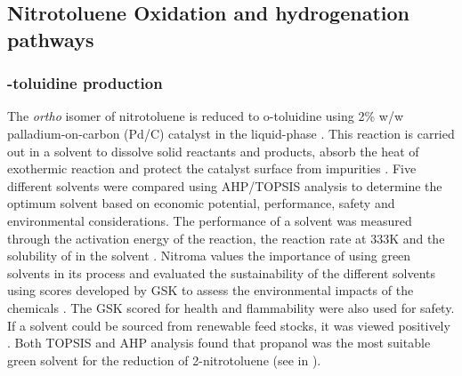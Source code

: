 

\subsection{Nitrotoluene Oxidation and hydrogenation pathways}
\subsubsection{\ortho-toluidine production}
The \textit{ortho} isomer of nitrotoluene is reduced to o-toluidine using  2\% w/w palladium-on-carbon (Pd/C) catalyst in the liquid-phase \cite{rajadhyaksha_solvent_1986}. This reaction is carried out in a solvent to dissolve solid reactants and products, absorb the heat of exothermic reaction and protect the catalyst surface from impurities \cite{yao_kinetics_1959}. Five different solvents were compared using AHP/TOPSIS analysis to determine the optimum solvent based on economic potential, performance, safety and environmental considerations. The performance of a solvent was measured through the activation energy of the reaction, the reaction rate at 333K and the solubility of  in the solvent \cite{rajadhyaksha_solvent_1986}. Nitroma values the importance of using green solvents in its process and evaluated the sustainability of the different solvents using scores developed by GSK to assess the environmental impacts of the chemicals \cite{henderson_expanding_2011}. The GSK scored for health and flammability were also used for safety. If a solvent could be sourced from renewable feed stocks, it was viewed positively \cite{byrne_tools_2016}. Both TOPSIS and AHP analysis found that propanol was the most suitable green solvent for the reduction of 2-nitrotoluene (see  in ). 

